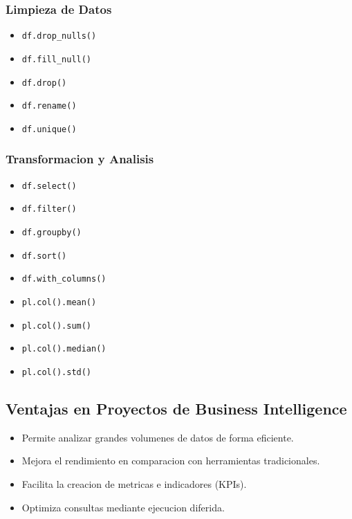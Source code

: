 \subsubsection{Limpieza de Datos}

\begin{itemize}
    \item \texttt{df.drop\_nulls()}
    \item \texttt{df.fill\_null()}
    \item \texttt{df.drop()}
    \item \texttt{df.rename()}
    \item \texttt{df.unique()}
\end{itemize}

\subsubsection{Transformacion y Analisis}

\begin{itemize}
    \item \texttt{df.select()}
    \item \texttt{df.filter()}
    \item \texttt{df.groupby()}
    \item \texttt{df.sort()}
    \item \texttt{df.with\_columns()}
    \item \texttt{pl.col().mean()}
    \item \texttt{pl.col().sum()}
    \item \texttt{pl.col().median()}
    \item \texttt{pl.col().std()}
\end{itemize}

\subsection{Ventajas en Proyectos de Business Intelligence}

\begin{itemize}
    \item Permite analizar grandes volumenes de datos de forma eficiente.
    \item Mejora el rendimiento en comparacion con herramientas tradicionales.
    \item Facilita la creacion de metricas e indicadores (KPIs).
    \item Optimiza consultas mediante ejecucion diferida.
\end{itemize}